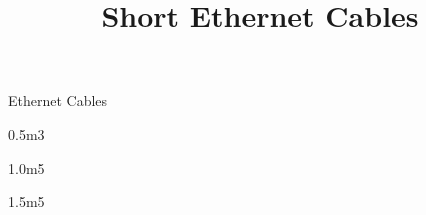 \def\papersize{5}




\title{Short Ethernet Cables}

\begin{checklist}{Ethernet Cables}
  \item{0.5m}{3}
  \item{1.0m}{5}
  \item{1.5m}{5}
\end{checklist}



